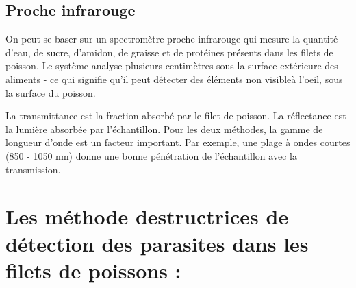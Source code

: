 \documentclass[12pt,a4paper]{article}
\begin{document}
\subsection{Proche infrarouge}

On peut se baser sur un spectromètre proche infrarouge qui mesure la quantité d'eau, de sucre, d'amidon, de graisse et de protéines présents dans les filets de poisson. Le système analyse plusieurs centimètres sous la surface extérieure des aliments - ce qui signifie qu'il peut détecter des éléments non visibleà l'oeil, sous la surface du poisson.


La transmittance est la fraction absorbé par le filet de poisson. La réflectance est la lumière absorbée par l'échantillon.
Pour les deux méthodes, la gamme de longueur d'onde est un facteur important. Par exemple, une plage à ondes courtes (850 - 1050 nm) donne une bonne pénétration de l'échantillon avec la transmission.


\newpage
\section {Les  méthode destructrices de détection des parasites dans les filets de poissons :}
\end{document}
